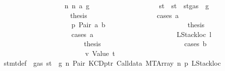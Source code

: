 \begin{isabellebody}
\ \ \ \ \ \ \ \ \ \ \ \ \ \ \ \ \ \ \isamarkupfalse%
\ n{}{\isacharcolon}{\kern0pt}\ {\isacharparenleft}{\kern0pt}n\ a\ g{\isacharprime}{\kern0pt}{\isacharprime}{\kern0pt}{\isacharparenright}{\kern0pt}\isanewline
\ \ \ \ \ \ \ \ \ \ \ \ \ \ \ \ \ \ \isamarkupfalse%
\ st{\isacharprime}{\kern0pt}{\isacharprime}{\kern0pt}{\isacharprime}{\kern0pt}\ \ {\isachardoublequoteopen}st{\isacharprime}{\kern0pt}{\isacharprime}{\kern0pt}{\isacharprime}{\kern0pt}\ {\isacharequal}{\kern0pt}\ st{\isacharprime}{\kern0pt}{\isacharprime}{\kern0pt}{\isasymlparr}gas\ {\isacharcolon}{\kern0pt}{\isacharequal}{\kern0pt}\ g{\isacharprime}{\kern0pt}{\isacharprime}{\kern0pt}{\isasymrparr}{\isachardoublequoteclose}\isanewline
\ \ \ \ \ \ \ \ \ \ \ \ \ \ \ \ \ \ \isamarkupfalse%
\ \isamarkupfalse%
\ {\isacharquery}{\kern0pt}thesis\isanewline
\ \ \ \ \ \ \ \ \ \ \ \ \ \ \ \ \ \ \isamarkupfalse%
\ {\isacharparenleft}{\kern0pt}cases\ a{\isacharparenright}{\kern0pt}\isanewline
\ \ \ \ \ \ \ \ \ \ \ \ \ \ \ \ \ \ \ \ \isamarkupfalse%
\ p{}{\isacharcolon}{\kern0pt}\ {\isacharparenleft}{\kern0pt}Pair\ a\ b{\isacharparenright}{\kern0pt}\isanewline
\ \ \ \ \ \ \ \ \ \ \ \ \ \ \ \ \ \ \ \ \isamarkupfalse%
\ \isamarkupfalse%
\ {\isacharquery}{\kern0pt}thesis\isanewline
\ \ \ \ \ \ \ \ \ \ \ \ \ \ \ \ \ \ \ \ \isamarkupfalse%
\ {\isacharparenleft}{\kern0pt}cases\ a{\isacharparenright}{\kern0pt}\isanewline
\ \ \ \ \ \ \ \ \ \ \ \ \ \ \ \ \ \ \ \ \ \ \isamarkupfalse%
\ {\isacharparenleft}{\kern0pt}LStackloc\ l{\isacharparenright}{\kern0pt}\isanewline
\ \ \ \ \ \ \ \ \ \ \ \ \ \ \ \ \ \ \ \ \ \ \isamarkupfalse%
\ \isamarkupfalse%
\ {\isacharquery}{\kern0pt}thesis\isanewline
\ \ \ \ \ \ \ \ \ \ \ \ \ \ \ \ \ \ \ \ \ \ \isamarkupfalse%
\ {\isacharparenleft}{\kern0pt}cases\ b{\isacharparenright}{\kern0pt}\isanewline
\ \ \ \ \ \ \ \ \ \ \ \ \ \ \ \ \ \ \ \ \ \ \ \ \isamarkupfalse%
\ v{}{\isacharcolon}{\kern0pt}\ {\isacharparenleft}{\kern0pt}Value\ t{\isacharprime}{\kern0pt}{\isacharparenright}{\kern0pt}\isanewline
\ \ \ \ \ \ \ \ \ \ \ \ \ \ \ \ \ \ \ \ \ \ \ \ \isamarkupfalse%
\ {}{\isacharparenleft}{\kern0pt}{}{\isacharparenright}{\kern0pt}\ stmt{\isacharunderscore}{\kern0pt}def\ {\isacharbackquoteopen}{\isasymnot}\ gas\ st\ {\isasymle}\ g{\isacharbackquoteclose}\ n\ Pair\ KCDptr\ Calldata\ MTArray\ n{}\ p{}\ LStackloc\ \isamarkupfalse%

\end{isabellebody}
